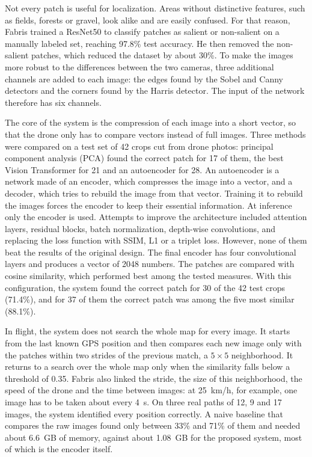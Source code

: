 \documentclass[english, Lau, oneside]{sapthesis}%
\begin{document}
Not every patch is useful for localization. Areas without distinctive features, such as fields, forests or gravel, look alike and are easily confused. For that reason, Fabris trained a ResNet50 to classify patches as salient or non-salient on a manually labeled set, reaching 97.8\% test accuracy. He then removed the non-salient patches, which reduced the dataset by about 30\%. To make the images more robust to the differences between the two cameras, three additional channels are added to each image: the edges found by the Sobel and Canny detectors and the corners found by the Harris detector. The input of the network therefore has six channels.

The core of the system is the compression of each image into a short vector, so that the drone only has to compare vectors instead of full images. Three methods were compared on a test set of 42 crops cut from drone photos: principal component analysis (PCA) found the correct patch for 17 of them, the best Vision Transformer for 21 and an autoencoder for 28. An autoencoder is a network made of an encoder, which compresses the image into a vector, and a decoder, which tries to rebuild the image from that vector. Training it to rebuild the images forces the encoder to keep their essential information. At inference only the encoder is used. Attempts to improve the architecture included attention layers, residual blocks, batch normalization, depth-wise convolutions, and replacing the loss function with SSIM, L1 or a triplet loss. However, none of them beat the results of the original design. The final encoder has four convolutional layers and produces a vector of 2048 numbers. The patches are compared with cosine similarity, which performed best among the tested measures. With this configuration, the system found the correct patch for 30 of the 42 test crops (71.4\%), and for 37 of them the correct patch was among the five most similar (88.1\%).

In flight, the system does not search the whole map for every image. It starts from the last known GPS position and then compares each new image only with the patches within two strides of the previous match, a $5 \times 5$ neighborhood. It returns to a search over the whole map only when the similarity falls below a threshold of 0.35. Fabris also linked the stride, the size of this neighborhood, the speed of the drone and the time between images: at 25~km/h, for example, one image has to be taken about every 4~s. On three real paths of 12, 9 and 17 images, the system identified every position correctly. A naive baseline that compares the raw images found only between 33\% and 71\% of them and needed about 6.6~GB of memory, against about 1.08~GB for the proposed system, most of which is the encoder itself.
\end{document}
